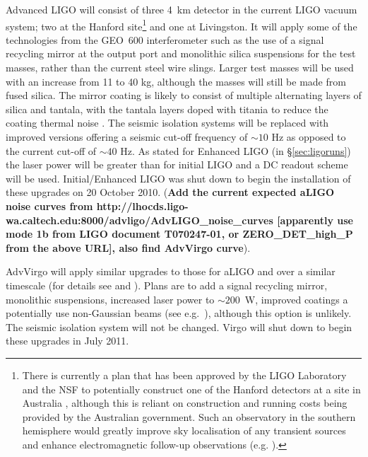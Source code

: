 \documentclass{article}
\begin{document}
Advanced LIGO will consist of three 4~km detector in the current LIGO vacuum system;
two at the Hanford site\footnote{There is currently a plan that
has been approved by the LIGO Laboratory and the NSF to potentially construct one of the 
Hanford detectors at a site in Australia \cite{Marx:2010}, although this is reliant
on construction and running costs being provided by the Australian government.
Such an observatory in the southern hemisphere would greatly improve sky localisation
of any transient sources and enhance electromagnetic follow-up observations (e.g. 
\cite{Barriga:2010}).} and one at Livingston. It will apply some of the
technologies from the GEO~600 interferometer such as the use of a signal
recycling mirror at the output port and monolithic silica suspensions for the
test masses, rather than the current steel wire slings. Larger test masses will
be used with an increase from 11 to 40 kg, although the masses will still be
made from fused silica. The mirror coating is likely to consist of multiple 
alternating layers of silica and tantala, with the tantala layers doped with 
titania to reduce the coating thermal noise \cite{Agresti:2006}. The seismic isolation systems will be
replaced with improved versions offering a seismic cut-off frequency of $\sim10$
Hz as opposed to the current cut-off of $\sim40$ Hz. As stated for Enhanced LIGO 
(in \S\ref{sec:ligoruns}) the laser power will be greater than for initial 
LIGO and a DC readout scheme will be used. Initial/Enhanced LIGO was shut down 
to begin the installation of these upgrades on 20 October 2010. ({\bf Add the current
expected aLIGO noise curves from
http://lhocds.ligo-wa.caltech.edu:8000/advligo/AdvLIGO\_noise\_curves
[apparently use mode 1b from LIGO document T070247-01, or ZERO\_DET\_high\_P
from the above URL], also find AdvVirgo curve}).

AdvVirgo will apply similar upgrades to those for aLIGO and over a similar
timescale (for details see \cite{AdVwhitepaper} and \cite{AdVdesign}). Plans are
to add a signal recycling mirror, monolithic suspensions, increased laser power
to $\sim200$~W, improved coatings a potentially use non-Gaussian beams (see 
e.g.~\cite{Freise:2010}), although this option is unlikely. The seismic isolation
system will not be changed. Virgo will shut down to begin these upgrades in July
2011.
\end{document}
